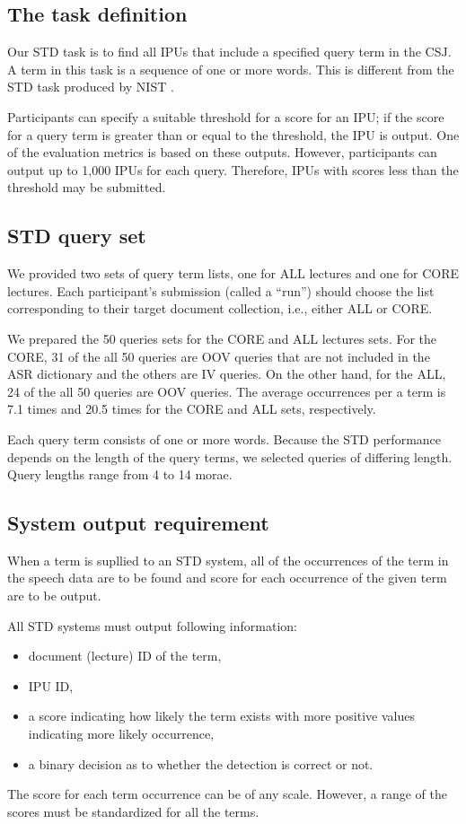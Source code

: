 \documentclass[english]{jnlp_1.4}
\begin{document}
\subsection{The task definition}

Our STD task is to find all IPUs that include a specified query term 
in the CSJ. A term in this task is a sequence of one or more words.
This is different from the STD task produced by NIST \cite{NIST}.

Participants can specify a suitable threshold for a score 
for an IPU;
if the score for a query term is greater than or equal to 
the threshold, the IPU is output. 
One of the evaluation metrics is based on these outputs. 
However, participants can output up to 1,000 IPUs for each query.
Therefore, IPUs with scores less than the threshold may be submitted.


\subsection{STD query set}

We provided two sets of query term lists, one for ALL lectures and one
for CORE lectures. Each participant's submission (called a ``run'')
should choose the list corresponding to their target document
collection, i.e., either ALL or CORE. 

We prepared the 50 queries sets for the CORE and ALL lectures sets.
For the CORE, 31 of the all 50 queries are OOV queries
that are not included in the ASR dictionary and the others are IV
queries. 
On the other hand, for the ALL, 24 of the all 50 queries are OOV
queries. 
The average occurrences per a term is 7.1 times and 20.5 times for the
CORE and ALL sets, respectively. 

Each query term consists of one or more words. Because the STD
performance depends on the length of the query terms, we selected
queries of differing length. Query lengths range from 4 to 14 morae.


\subsection{System output requirement}

When a term is supllied to an STD system, all of the occurrences of the
term in the speech data are to be found and score for each occurrence of
the given term are to be output.

All STD systems must output following information:
\begin{itemize}
\item document (lecture) ID of the term,
\item IPU ID,
\item a score indicating how likely the term exists with more positive values 
      indicating more likely occurrence,
\item a binary decision as to whether the detection is correct or not.
\end{itemize}
The score for each term occurrence can be of any scale. 
However, a range of the scores must be standardized for all the terms. 
\end{document}
